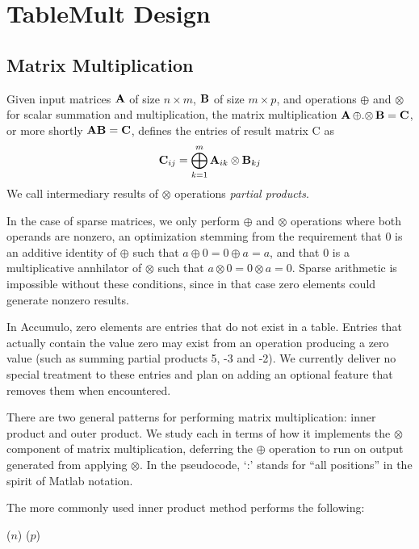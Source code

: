 
\section{TableMult Design}
\label{sDesign}


\subsection{Matrix Multiplication}
Given input matrices $\mathbf{A}$ of size $n \times m$, $\mathbf{B}$ of size $m \times p$,
and operations $\oplus$ and $\otimes$ for scalar summation and multiplication,
the matrix multiplication $\mathbf{A} \,{\oplus}.{\otimes}\, \mathbf{B} = \mathbf{C}$, or more shortly $\mathbf{A}\mathbf{B} = \mathbf{C}$,
defines the entries of result matrix C as 
\[ \mathbf{C}_{ij} = \bigoplus_{k=1}^m \mathbf{A}_{ik} \otimes \mathbf{B}_{kj} \]
We call intermediary results of $\otimes$ operations \emph{partial products}.

In the case of sparse matrices, we only perform $\oplus$ and $\otimes$ operations where both operands are nonzero,
an optimization stemming from the requirement that 0 is an additive identity of $\oplus$ such that $a \oplus 0 = 0 \oplus a = a$,
and that 0 is a multiplicative annhilator of $\otimes$ such that $a \otimes 0 = 0 \otimes a = 0$.
Sparse arithmetic is impossible without these conditions, since in that case zero elements could generate nonzero results.

In Accumulo, zero elements are entries that do not exist in a table. Entries that actually contain the value zero may exist
from an operation producing a zero value (such as summing partial products 5, -3 and -2).  
We currently deliver no special treatment to these entries and plan on adding
an optional feature that removes them when encountered.

There are two general patterns for performing matrix multiplication: inner product and outer product.
We study each in terms of how it implements the $\otimes$ component of matrix multiplication,
deferring the $\oplus$ operation to run on output generated from applying $\otimes$.
In the pseudocode, `:' stands for ``all positions'' in the spirit of Matlab notation.

The more commonly used inner product method performs the following:
\begin{algorithm}[h]
\fore($n$){
\fore($p$){
}}
\end{algorithm}

